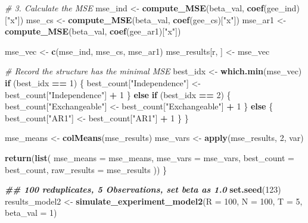 \documentclass[
]{article}
\newenvironment{Shaded}{\begin{snugshade}}{\end{snugshade}}
\newcommand{\AttributeTok}[1]{\textcolor[rgb]{0.13,0.29,0.53}{#1}}
\newcommand{\CommentTok}[1]{\textcolor[rgb]{0.56,0.35,0.01}{\textit{#1}}}
\newcommand{\ControlFlowTok}[1]{\textcolor[rgb]{0.13,0.29,0.53}{\textbf{#1}}}
\newcommand{\DecValTok}[1]{\textcolor[rgb]{0.00,0.00,0.81}{#1}}
\newcommand{\DocumentationTok}[1]{\textcolor[rgb]{0.56,0.35,0.01}{\textbf{\textit{#1}}}}
\newcommand{\FunctionTok}[1]{\textcolor[rgb]{0.13,0.29,0.53}{\textbf{#1}}}
\newcommand{\NormalTok}[1]{#1}
\newcommand{\OtherTok}[1]{\textcolor[rgb]{0.56,0.35,0.01}{#1}}
\newcommand{\SpecialCharTok}[1]{\textcolor[rgb]{0.81,0.36,0.00}{\textbf{#1}}}
\newcommand{\StringTok}[1]{\textcolor[rgb]{0.31,0.60,0.02}{#1}}
\begin{document}
\begin{Shaded}
\begin{Highlighting}[]
    \CommentTok{\# 3. Calculate the MSE }
\NormalTok{    mse\_ind }\OtherTok{\textless{}{-}} \FunctionTok{compute\_MSE}\NormalTok{(beta\_val, }\FunctionTok{coef}\NormalTok{(gee\_ind)[}\StringTok{"x"}\NormalTok{])}
\NormalTok{    mse\_cs  }\OtherTok{\textless{}{-}} \FunctionTok{compute\_MSE}\NormalTok{(beta\_val, }\FunctionTok{coef}\NormalTok{(gee\_cs)[}\StringTok{"x"}\NormalTok{])}
\NormalTok{    mse\_ar1 }\OtherTok{\textless{}{-}} \FunctionTok{compute\_MSE}\NormalTok{(beta\_val, }\FunctionTok{coef}\NormalTok{(gee\_ar1)[}\StringTok{"x"}\NormalTok{])}
    
\NormalTok{    mse\_vec }\OtherTok{\textless{}{-}} \FunctionTok{c}\NormalTok{(mse\_ind, mse\_cs, mse\_ar1)}
\NormalTok{    mse\_results[r, ] }\OtherTok{\textless{}{-}}\NormalTok{ mse\_vec}
    
    \CommentTok{\# Record the structure has the minimal MSE}
\NormalTok{    best\_idx }\OtherTok{\textless{}{-}} \FunctionTok{which.min}\NormalTok{(mse\_vec)}
    \ControlFlowTok{if}\NormalTok{ (best\_idx }\SpecialCharTok{==} \DecValTok{1}\NormalTok{) \{}
\NormalTok{      best\_count[}\StringTok{"Independence"}\NormalTok{] }\OtherTok{\textless{}{-}}\NormalTok{ best\_count[}\StringTok{"Independence"}\NormalTok{] }\SpecialCharTok{+} \DecValTok{1}
\NormalTok{    \} }\ControlFlowTok{else} \ControlFlowTok{if}\NormalTok{ (best\_idx }\SpecialCharTok{==} \DecValTok{2}\NormalTok{) \{}
\NormalTok{      best\_count[}\StringTok{"Exchangeable"}\NormalTok{] }\OtherTok{\textless{}{-}}\NormalTok{ best\_count[}\StringTok{"Exchangeable"}\NormalTok{] }\SpecialCharTok{+} \DecValTok{1}
\NormalTok{    \} }\ControlFlowTok{else}\NormalTok{ \{}
\NormalTok{      best\_count[}\StringTok{"AR1"}\NormalTok{] }\OtherTok{\textless{}{-}}\NormalTok{ best\_count[}\StringTok{"AR1"}\NormalTok{] }\SpecialCharTok{+} \DecValTok{1}
\NormalTok{    \}}
\NormalTok{  \}}
  
  
\NormalTok{  mse\_means }\OtherTok{\textless{}{-}} \FunctionTok{colMeans}\NormalTok{(mse\_results)}
\NormalTok{  mse\_vars }\OtherTok{\textless{}{-}} \FunctionTok{apply}\NormalTok{(mse\_results, }\DecValTok{2}\NormalTok{, var)}
  
  
  \FunctionTok{return}\NormalTok{(}\FunctionTok{list}\NormalTok{(}
    \AttributeTok{mse\_means =}\NormalTok{ mse\_means,}
    \AttributeTok{mse\_vars =}\NormalTok{ mse\_vars,}
    \AttributeTok{best\_count =}\NormalTok{ best\_count,}
    \AttributeTok{raw\_results =}\NormalTok{ mse\_results}
\NormalTok{  ))}
\NormalTok{\}}

\DocumentationTok{\#\# 100 reduplicates, 5 Observations, set beta as 1.0}
\FunctionTok{set.seed}\NormalTok{(}\DecValTok{123}\NormalTok{)}
\NormalTok{results\_model2 }\OtherTok{\textless{}{-}} \FunctionTok{simulate\_experiment\_model2}\NormalTok{(}\AttributeTok{R =} \DecValTok{100}\NormalTok{, }\AttributeTok{N =} \DecValTok{100}\NormalTok{, }\AttributeTok{T =} \DecValTok{5}\NormalTok{, }\AttributeTok{beta\_val =} \DecValTok{1}\NormalTok{)}


\end{Highlighting}
\end{Shaded}
\end{document}
